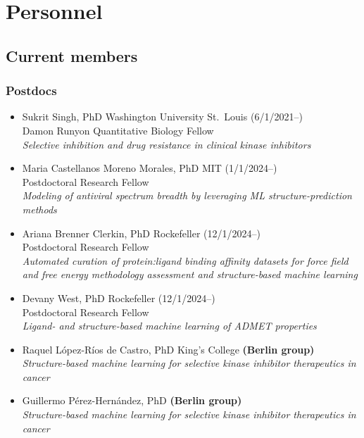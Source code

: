 \documentclass[10pt]{article}
\begin{document}
\eject


\section*{Personnel}

\subsection*{Current members}

\subsubsection*{Postdocs}

\begin{itemize}
  \item Sukrit Singh, PhD Washington University St.\ Louis (6/1/2021--) \\
  Damon Runyon Quantitative Biology Fellow\\
  \emph{Selective inhibition and drug resistance in clinical kinase inhibitors}

  \item Maria Castellanos Moreno Morales, PhD MIT (1/1/2024--) \\
  Postdoctoral Research Fellow \\
  \emph{Modeling of antiviral spectrum breadth by leveraging ML structure-prediction methods}

  \item Ariana Brenner Clerkin, PhD Rockefeller (12/1/2024--) \\
  Postdoctoral Research Fellow \\
  \emph{Automated curation of protein:ligand binding affinity datasets for force field and free energy methodology assessment and structure-based machine learning}

  \item Devany West, PhD Rockefeller (12/1/2024--) \\
  Postdoctoral Research Fellow \\
  \emph{Ligand- and structure-based machine learning of ADMET properties}

  \item Raquel López-Ríos de Castro, PhD King's College {\bf (Berlin group)}\\
  \emph{Structure-based machine learning for selective kinase inhibitor therapeutics in cancer}

  \item Guillermo Pérez-Hernández, PhD {\bf (Berlin group)}\\
  \emph{Structure-based machine learning for selective kinase inhibitor therapeutics in cancer}

\end{itemize}
\end{document}
